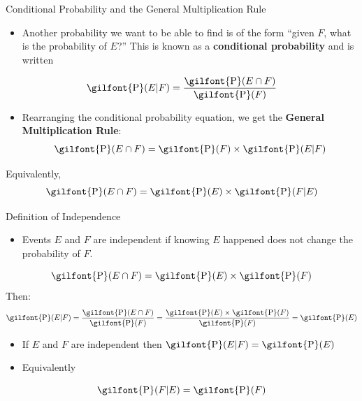 \documentclass[
  ignorenonframetext,
]{beamer}
\providecommand{\tightlist}{%
  \setlength{\itemsep}{0pt}\setlength{\parskip}{0pt}}
\begin{document}
\begin{frame}{Conditional Probability and the General Multiplication
Rule}
\protect\hypertarget{conditional-probability-and-the-general-multiplication-rule}{}
\begin{itemize}
\tightlist
\item
  Another probability we want to be able to find is of the form ``given
  \(F\), what is the probability of \(E\)?'' This is known as a
  \textbf{conditional probability} and is written
\end{itemize}

\[\textrm{\gilfont{P}}\normalfont (E | F)=\frac{\textrm{\gilfont{P}}\normalfont ( E \cap  F)}{\textrm{\gilfont{P}}\normalfont ( F)}\]

\begin{itemize}
\tightlist
\item
  Rearranging the conditional probability equation, we get the
  \textbf{General Multiplication Rule}:
  \[\textrm{\gilfont{P}}\normalfont ( E \cap  F)=\textrm{\gilfont{P}}\normalfont ( F)\times \textrm{\gilfont{P}}\normalfont ( E| F)\]
\end{itemize}

Equivalently,
\[\textrm{\gilfont{P}}\normalfont (E \cap F)=\textrm{\gilfont{P}}\normalfont (E)\times \textrm{\gilfont{P}}\normalfont (F| E)\]
\end{frame}

\begin{frame}{Definition of Independence}
\protect\hypertarget{definition-of-independence}{}
\begin{itemize}
\tightlist
\item
  Events \(E\) and \(F\) are independent if knowing \(E\) happened does
  not change the probability of \(F\).
\end{itemize}

\[\textrm{\gilfont{P}}\normalfont ( E \cap  F)=\textrm{\gilfont{P}}\normalfont ( E)\times \textrm{\gilfont{P}}\normalfont ( F)\]
Then:
\[\textrm{\gilfont{P}}\normalfont ( E|  F)=\frac{\textrm{\gilfont{P}}\normalfont ( E \cap  F)}{\textrm{\gilfont{P}}\normalfont ( F)}=\frac{\textrm{\gilfont{P}}\normalfont ( E)\times \textrm{\gilfont{P}}\normalfont ( F)}{\textrm{\gilfont{P}}\normalfont ( F)}=\textrm{\gilfont{P}}\normalfont ( E)\]

\begin{itemize}
\item
  If \(E\) and \(F\) are independent then
  \(\textrm{\gilfont{P}}\normalfont ( E| F)=\textrm{\gilfont{P}}\normalfont ( E)\)
\item
  Equivalently
\end{itemize}

\[\textrm{\gilfont{P}}\normalfont (F|E)=\textrm{\gilfont{P}}\normalfont ( F)\]
\end{frame}
\end{document}
